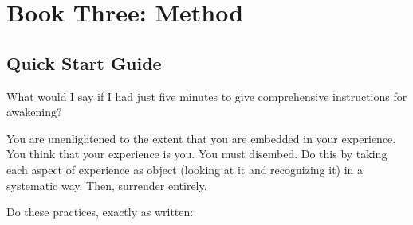 \documentclass[a5paper,10pt,english]{book}
\begin{document}
\sphinxstepscope


\chapter{Book Three: Method}
\label{\detokenize{main-3:book-three-method}}\label{\detokenize{main-3::doc}}

\section{Quick Start Guide}
\label{\detokenize{main-3:quick-start-guide}}
\sphinxAtStartPar
What would I say if I had just five minutes to give comprehensive
instructions for awakening?

\sphinxAtStartPar
You are unenlightened to the extent that you are embedded in your
experience. You think that your experience is you. You must dis\sphinxhyphen{}embed.
Do this by taking each aspect of experience as object (looking at it and
recognizing it) in a systematic way. Then, surrender entirely.

\sphinxAtStartPar
Do these practices, exactly as written:
\end{document}
